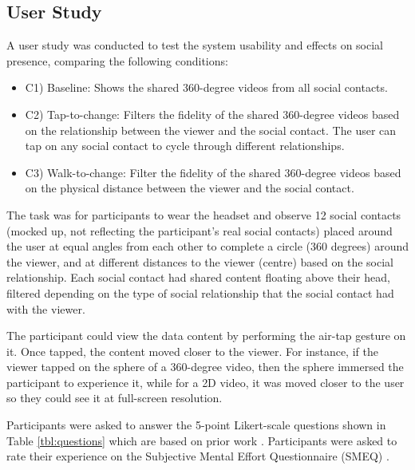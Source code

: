 \subsection{User Study}

A user study was conducted to test the system usability and effects on social presence, comparing the following conditions: 

\begin{itemize}
    \item C1) Baseline: Shows the shared 360-degree videos from all social contacts.
    \item C2) Tap-to-change: Filters the fidelity of the shared 360-degree videos based on the relationship between the viewer and the social contact. The user can tap on any social contact to cycle through different relationships.
    \item C3) Walk-to-change: Filter the fidelity of the shared 360-degree videos based on the physical distance between the viewer and the social contact.
\end{itemize}

The task was for participants to wear the headset and observe 12 social contacts (mocked up, not reflecting the participant's real social contacts) placed around the user at equal angles from each other to complete a circle (360 degrees) around the viewer, and at different distances to the viewer (centre) based on the social relationship. Each social contact had shared content floating above their head, filtered depending on the type of social relationship that the social contact had with the viewer. 

The participant could view the data content by performing the air-tap gesture on it. Once tapped, the content moved closer to the viewer. For instance, if the viewer tapped on the sphere of a 360-degree video, then the sphere immersed the participant to experience it, while for a 2D video, it was moved closer to the user so they could see it at full-screen resolution.

Participants were asked to answer the 5-point Likert-scale questions shown in Table \ref{tbl:questions} which are based on prior work \cite{Biocca2003}. Participants were asked to rate their experience on the Subjective Mental Effort Questionnaire (SMEQ) \cite{Sauro2009}. 

